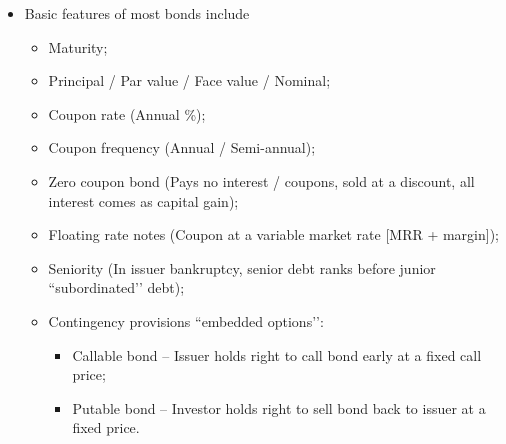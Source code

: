 \documentclass[../notes_compiled.tex]{subfiles}
\begin{document}
\begin{itemize}
\item Basic features of most bonds include
\begin{itemize}
\item Maturity;
\item Principal / Par value / Face value / Nominal;
\item Coupon rate (Annual \%);
\item Coupon frequency (Annual / Semi-annual);
\item Zero coupon bond (Pays no interest / coupons, sold at a discount, all interest comes as capital gain);
\item Floating rate notes (Coupon at a variable market rate [MRR + margin]);
\item Seniority (In issuer bankruptcy, senior debt ranks before junior ``subordinated’’ debt);
\item Contingency provisions ``embedded options’’:
\begin{itemize}
\item Callable bond -- Issuer holds right to call bond early at a fixed call price;
\item Putable bond -- Investor holds right to sell bond back to issuer at a fixed price.
\end{itemize}
\end{itemize}
\end{itemize}
\end{document}
